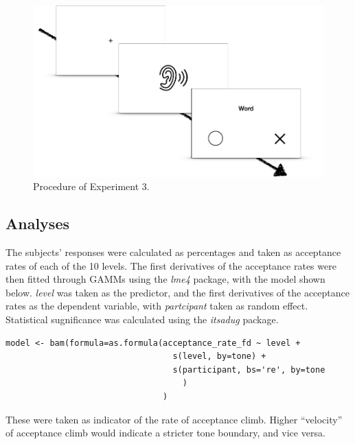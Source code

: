 \begin{figure}[h]
\centering
\includegraphics[width=.7\textwidth]{figures/E3/Procedure.png}
\caption{Procedure of Experiment 3.}
\label{Figure:Experiment3Procedure}
\end{figure}

\subsection{Analyses}\label{section:E3 Analyses}
The subjects' responses were calculated as percentages and taken as acceptance rates of each of the 10 levels. The first derivatives of the acceptance rates were then fitted through GAMMs using the \textit{lme4} package, with the model shown below. \textit{level} was taken as the predictor, and the first derivatives of the acceptance rates as the dependent variable, with \textit{partcipant} taken as random effect. Statistical sugnificance was calculated using the \textit{itsadug} package.
\begin{lstlisting}
model <- bam(formula=as.formula(acceptance_rate_fd ~ level + 
                                  s(level, by=tone) + 
                                  s(participant, bs='re', by=tone
                                    )
                                )
\end{lstlisting}
These were taken as indicator of the rate of acceptance climb. Higher ``velocity'' of acceptance climb would indicate a stricter tone boundary, and vice versa.